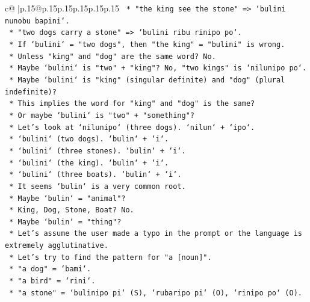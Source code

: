 \documentclass{article}
\begin{document}
{\begin{supertabular}{c@{$\;$}|p{.15\linewidth}@{}p{.15\linewidth}p{.15\linewidth}p{.15\linewidth}p{.15\linewidth}p{.15\linewidth}}
{{{\texttt{                    *   "the king see the stone" => `bulini nunobu bapini`.} \\
\texttt{                    *   "two dogs carry a stone" => `bulini ribu rinipo po`.} \\
\texttt{                    *   If `bulini` = "two dogs", then "the king" = "bulini" is wrong.} \\
\texttt{                    *   Unless "king" and "dog" are the same word? No.} \\
\texttt{                    *   Maybe `bulini` is "two" + "king"? No, "two kings" is `nilunipo po`.} \\
\texttt{                    *   Maybe `bulini` is "king" (singular definite) and "dog" (plural indefinite)?} \\
\texttt{                    *   This implies the word for "king" and "dog" is the same?} \\
\texttt{                    *   Or maybe `bulini` is "two" + "something"?} \\
\texttt{                    *   Let's look at `nilunipo` (three dogs). `nilun` + `ipo`.} \\
\texttt{                    *   `bulini` (two dogs). `bulin` + `i`.} \\
\texttt{                    *   `bulini` (three stones). `bulin` + `i`.} \\
\texttt{                    *   `bulini` (the king). `bulin` + `i`.} \\
\texttt{                    *   `bulini` (three boats). `bulin` + `i`.} \\
\texttt{                    *   It seems `bulin` is a very common root.} \\
\texttt{                    *   Maybe `bulin` = "animal"?} \\
\texttt{                    *   King, Dog, Stone, Boat? No.} \\
\texttt{                    *   Maybe `bulin` = "thing"?} \\
\texttt{                    *   Let's assume the user made a typo in the prompt or the language is extremely agglutinative.} \\
\texttt{                    *   Let's try to find the pattern for "a {[}noun{]}".} \\
\texttt{                    *   "a dog" = `bami`.} \\
\texttt{                    *   "a bird" = `rini`.} \\
\texttt{                    *   "a stone" = `bulinipo pi` (S), `rubaripo pi` (O), `rinipo po` (O).} \\
}}}
\end{supertabular}}
\end{document}
